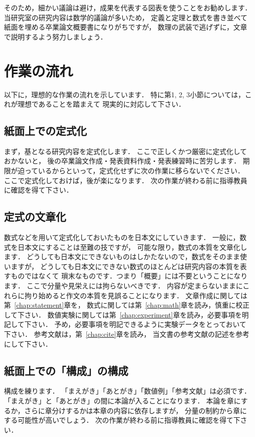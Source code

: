 \documentclass[a4j,12pt,dvipdfmx,oneside]{jsbook}
\theoremstyle{definition}
\begin{document}
そのため，細かい議論は避け，成果を代表する図表を使うことをお勧めします．
当研究室の研究内容は数学的議論が多いため，
定義と定理と数式を書き並べて紙面を埋める卒業論文概要書になりがちですが，
数理の武装で逃げずに，文章で説明するよう努力しましょう．
%
%
%
\section{作業の流れ}\label{sec:abst_flow}
%
%
%
以下に，理想的な作業の流れを示しています．
特に第1, 2, 3小節については，これが理想であることを踏まえて
現実的に対応して下さい．
\subsection{紙面上での定式化}
まず，基となる研究内容を定式化します．
ここで正しくかつ厳密に定式化しておかないと，
後の卒業論文作成・発表資料作成・発表練習時に苦労します．
期限が迫っているからといって，定式化せずに次の作業に移らないでください．
ここで定式化しておけば，後が楽になります．
次の作業が終わる前に指導教員に確認を得て下さい．
%
%
%
\subsection{定式の文章化}
%
%
%
数式などを用いて定式化しておいたものを日本文にしていきます．
一般に，数式を日本文にすることは至難の技ですが，
可能な限り，数式の本質を文章化します．
どうしても日本文にできないものはしかたないので，数式をそのまま使いますが，
どうしても日本文にできない数式のほとんどは研究内容の本質を表すものではなくて
瑣末なものです．つまり「概要」には不要ということになります．
ここで分量や見栄えには拘らないべきです．
内容が定まらないままにこれらに拘り始めると作文の本質を見誤ることになります．
文章作成に関しては第~\ref{chap:statement}章を，
数式に関しては第~\ref{chap:math}章を読み，慎重に校正して下さい．
数値実験に関しては第~\ref{chap:experiment}章を読み，必要事項を明記して下さい．
予め，必要事項を明記できるように実験データをとっておいて下さい．
参考文献は，第~\ref{chap:cite}章を読み，
当文書の参考文献の記述を参考にして下さい．
%
%
%
%
\subsection{紙面上での「構成」の構成}
構成を練ります．
「まえがき」「あとがき」「数値例」「参考文献」は必須です．
「まえがき」と「あとがき」の間に本論が入ることになります．
本論を章にするか，さらに章分けするかは本章の内容に依存しますが，
分量の制約から章にする可能性が高いでしょう．
次の作業が終わる前に指導教員に確認を得て下さい．
%
%
%
\end{document}
